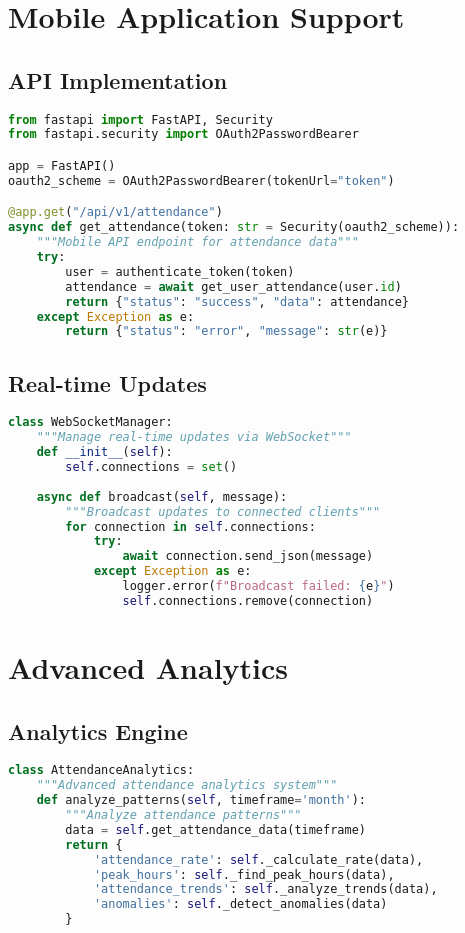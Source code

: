 \section{Mobile Application Support}

\subsection{API Implementation}
\begin{lstlisting}[language=Python]
from fastapi import FastAPI, Security
from fastapi.security import OAuth2PasswordBearer

app = FastAPI()
oauth2_scheme = OAuth2PasswordBearer(tokenUrl="token")

@app.get("/api/v1/attendance")
async def get_attendance(token: str = Security(oauth2_scheme)):
    """Mobile API endpoint for attendance data"""
    try:
        user = authenticate_token(token)
        attendance = await get_user_attendance(user.id)
        return {"status": "success", "data": attendance}
    except Exception as e:
        return {"status": "error", "message": str(e)}
\end{lstlisting}

\subsection{Real-time Updates}
\begin{lstlisting}[language=Python]
class WebSocketManager:
    """Manage real-time updates via WebSocket"""
    def __init__(self):
        self.connections = set()
        
    async def broadcast(self, message):
        """Broadcast updates to connected clients"""
        for connection in self.connections:
            try:
                await connection.send_json(message)
            except Exception as e:
                logger.error(f"Broadcast failed: {e}")
                self.connections.remove(connection)
\end{lstlisting}

\section{Advanced Analytics}

\subsection{Analytics Engine}
\begin{lstlisting}[language=Python]
class AttendanceAnalytics:
    """Advanced attendance analytics system"""
    def analyze_patterns(self, timeframe='month'):
        """Analyze attendance patterns"""
        data = self.get_attendance_data(timeframe)
        return {
            'attendance_rate': self._calculate_rate(data),
            'peak_hours': self._find_peak_hours(data),
            'attendance_trends': self._analyze_trends(data),
            'anomalies': self._detect_anomalies(data)
        }
\end{lstlisting}

